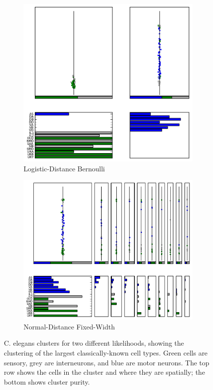 \documentclass{article}
\begin{document}
\begin{figure}
  \centering 
  \begin{subfigure}[b]{0.42\textwidth}
    \includegraphics[width=\textwidth]{celegans/celegans.2r.ld.00.data-fixed_100_200-anneal_slow_400.0.clusters.pdf}
    \caption{Logistic-Distance Bernoulli}
    \label{fig:celegans:clusters:ld}
  \end{subfigure}
  \begin{subfigure}[b]{0.47\textwidth}
    \includegraphics[width=\textwidth]{celegans/celegans.2r.ndfw.00.data-fixed_100_200-anneal_slow_400.0.clusters.pdf}
    \caption{Normal-Distance Fixed-Width}
    \label{fig:celegans:clusters:ndfw}
  \end{subfigure}
  \caption{C. elegans clusters for two different likelihoods, showing the clustering of the largest classically-known cell types. Green cells are sensory, grey are interneurons, and blue are motor neurons. The top row shows the cells in the cluster and where they are spatially; the bottom shows cluster purity. }
  \label{fig:celegans:clusters}
\end{figure}
\end{document}
